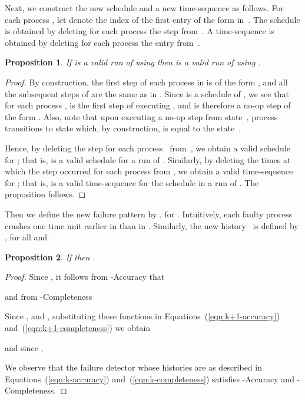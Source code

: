 \documentclass[11pt]{article}
\newtheorem{proposition}{Proposition}[section]
\begin{document}
Next, we construct the new schedule  and a new time-sequence
      as follows.
For each process , let  denote the
     index of the first entry of the form 
     in~.
The schedule  is obtained by deleting for each process  the
     step 
     from~.
A time-sequence  is obtained by deleting for each process 
     the entry  from~.

\begin{proposition}\label{lem:RprimeIsARunOfAlg}
If  is a valid run of
      using  then  is a valid run of 
     using .
\end{proposition}

\begin{proof}
By construction, the first step of each process  in  is
     of the form , and all the subsequent steps
     of  are the same as in .
Since  is a schedule of , we see that for
     each process ,  is the
     first step of  executing , and is therefore a
     no-op step of the form .
Also, note that upon executing a no-op step from
     state~, process  transitions to state
      which, by construction, is equal to
     the state~.  

Hence, by deleting the  step for each
     process~ from~, we obtain a valid schedule
     for ; that is,  is a valid schedule for a run of
     .
Similarly, by deleting the times at which the
      step occurred for each process 
     from , we obtain a valid time-sequence for ;
     that is,  is a valid time-sequence for the schedule  in
     a run of .
The proposition follows.
\end{proof}


Then we define the new failure pattern  by , for .
Intuitively, each faulty process crashes one time unit earlier in 
     than in .
Similarly, the new history~ is defined by , for all  and .

\begin{proposition}\label{lem:HinDk}
If   then .
\end{proposition} 

\begin{proof} 
Since , it follows from
-Accuracy that

and from -Completeness


Since , and ,
     substituting these functions in Equations~(\ref{eqn:k+1-accuracy})
     and~(\ref{eqn:k+1-completeness}) we obtain

and since ,

We observe that the failure detector whose histories are as described in
Equations~(\ref{eqn:k-accuracy}) and~(\ref{eqn:k-completeness}) 
     satisfies -Accuracy and -Completeness.
\end{proof}
\end{document}
